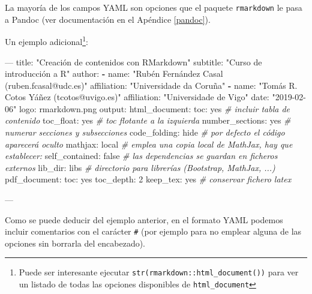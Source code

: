 \documentclass[]{book}
\newenvironment{Shaded}{\begin{snugshade}}{\end{snugshade}}
\newcommand{\KeywordTok}[1]{\textcolor[rgb]{0.13,0.29,0.53}{\textbf{#1}}}
\newcommand{\StringTok}[1]{\textcolor[rgb]{0.31,0.60,0.02}{#1}}
\newcommand{\CommentTok}[1]{\textcolor[rgb]{0.56,0.35,0.01}{\textit{#1}}}
\newcommand{\OtherTok}[1]{\textcolor[rgb]{0.56,0.35,0.01}{#1}}
\newcommand{\FunctionTok}[1]{\textcolor[rgb]{0.00,0.00,0.00}{#1}}
\newcommand{\AttributeTok}[1]{\textcolor[rgb]{0.77,0.63,0.00}{#1}}
\let\rmarkdownfootnote\footnote%
\def\footnote{\protect\rmarkdownfootnote}
\theoremstyle{definition}
\theoremstyle{definition}
\theoremstyle{definition}
\theoremstyle{remark}
\begin{document}
La mayoría de los campos YAML son opciones que el paquete
\texttt{rmarkdown} le pasa a Pandoc (ver documentación en el Apéndice
\ref{pandoc}).

Un ejemplo adicional\footnote{Puede ser interesante ejecutar
  \texttt{str(rmarkdown::html\_document())} para ver un listado de todas
  las opciones disponibles de \texttt{html\_document}}:

\begin{Shaded}
\begin{Highlighting}[]
\OtherTok{---}
\FunctionTok{title:}\AttributeTok{ }\StringTok{"Creación de contenidos con RMarkdown"}
\FunctionTok{subtitle:}\AttributeTok{ }\StringTok{"Curso de introducción a R"}
\FunctionTok{author:}
\KeywordTok{-} \FunctionTok{name:}\AttributeTok{ }\StringTok{"Rubén Fernández Casal (ruben.fcasal@udc.es)"}
  \FunctionTok{affiliation:}\AttributeTok{ }\StringTok{"Universidade da Coruña"}
\KeywordTok{-} \FunctionTok{name:}\AttributeTok{ }\StringTok{"Tomás R. Cotos Yáñez (tcotos@uvigo.es)"}
  \FunctionTok{affiliation:}\AttributeTok{ }\StringTok{"Universidade de Vigo"}
\FunctionTok{date:}\AttributeTok{ }\StringTok{"2019-02-06"}
\FunctionTok{logo:}\AttributeTok{ rmarkdown.png}
\FunctionTok{output:}
  \FunctionTok{html_document:}
    \FunctionTok{toc:}\AttributeTok{ yes                  }\CommentTok{# incluir tabla de contenido}
    \FunctionTok{toc_float:}\AttributeTok{ yes            }\CommentTok{# toc flotante a la izquierda}
    \FunctionTok{number_sections:}\AttributeTok{ yes      }\CommentTok{# numerar secciones y subsecciones}
    \FunctionTok{code_folding:}\AttributeTok{ hide        }\CommentTok{# por defecto el código aparecerá oculto}
    \FunctionTok{mathjax:}\AttributeTok{ local            }\CommentTok{# emplea una copia local de MathJax, hay que establecer:}
    \FunctionTok{self_contained:}\AttributeTok{ false     }\CommentTok{# las dependencias se guardan en ficheros externos}
    \FunctionTok{lib_dir:}\AttributeTok{ libs             }\CommentTok{# directorio para librerías (Bootstrap, MathJax, ...)}
  \FunctionTok{pdf_document:}
    \FunctionTok{toc:}\AttributeTok{ yes}
    \FunctionTok{toc_depth:}\AttributeTok{ 2}
    \FunctionTok{keep_tex:}\AttributeTok{ yes             }\CommentTok{# conservar fichero latex}
    
\OtherTok{---}
\end{Highlighting}
\end{Shaded}

Como se puede deducir del ejemplo anterior, en el formato YAML podemos
incluir comentarios con el carácter \texttt{\#} (por ejemplo para no
emplear alguna de las opciones sin borrarla del encabezado).
\end{document}
